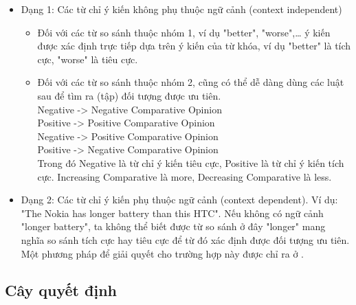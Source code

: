 \documentclass[12pt]{extarticle}
\begin{document}
				\begin{itemize}
				\item{Dạng 1: Các từ chỉ ý kiến không phụ thuộc ngữ cảnh (context independent)
					\begin{itemize}
						\item{Đối với các từ so sánh thuộc nhóm 1, ví dụ "better", "worse",… ý kiến được xác định trực tiếp dựa trên ý kiến của từ khóa, ví dụ "better" là tích cực, "worse" là tiêu cực.}
						\item{Đối với các từ so sánh thuộc nhóm 2, cũng có thể dễ dàng dùng các luật sau để tìm ra (tập) đối tượng được ưu tiên.				
							\\<Increasing Comparative> Negative -> Negative Comparative Opinion
							\\<Increasing Comparative> Positive -> Positive Comparative Opinion
							\\<Decreasing Comparative> Negative -> Positive Comparative Opinion
							\\<Decreasing Comparative> Positive -> Negative Comparative Opinion
							\\Trong đó Negative là từ chỉ ý kiến tiêu cực, Positive là từ chỉ ý kiến tích cực. Increasing Comparative là more, Decreasing Comparative là less.}
					\end{itemize}}
				\item{Dạng 2: Các từ chỉ ý kiến phụ thuộc ngữ cảnh (context dependent). Ví dụ: "The Nokia has longer battery than this HTC". Nếu không có ngữ cảnh "longer battery", ta không thể biết được từ so sánh ở đây "longer" mang nghĩa so sánh tích cực hay tiêu cực để từ đó xác định được đối tượng ưu tiên. Một phương pháp để giải quyết cho trường hợp này được chỉ ra ở \cite{comparative2}.}
				\end{itemize}
		\subsection{Cây quyết định}
\end{document}
